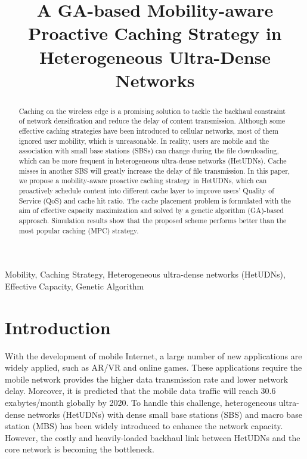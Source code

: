 \documentclass[conference]{IEEEtran}
\begin{document}
\title{A GA-based Mobility-aware Proactive Caching Strategy in Heterogeneous Ultra-Dense Networks}

\author{


}

\maketitle

\begin{abstract}
Caching on the wireless edge is a promising solution to tackle the backhaul constraint of network densification and reduce the delay of content transmission. Although some effective caching strategies have been introduced to cellular networks, most of them ignored user mobility, which is unreasonable. In reality, users are mobile and the association with small base stations (SBSs) can change during the file downloading, which can be more frequent in heterogeneous ultra-dense networks (HetUDNs). Cache misses in another SBS will greatly increase the delay of file transmission. In this paper, we propose a mobility-aware proactive caching strategy in HetUDNs, which can proactively schedule content into different cache layer to improve users’ Quality of Service (QoS) and cache hit ratio. The cache placement problem is formulated with the aim of effective capacity maximization and solved by a genetic algorithm (GA)-based approach. Simulation results show that the proposed scheme performs better than the most popular caching (MPC) strategy.
\end{abstract}

\begin{IEEEkeywords}
 Mobility, Caching Strategy, Heterogeneous ultra-dense networks (HetUDNs), Effective Capacity, Genetic Algorithm
\end{IEEEkeywords}

\section{Introduction}
With the development of mobile Internet, a large number of new applications are widely applied, such as AR/VR and online games. These applications require the mobile network provides the higher data transmission rate and lower network delay. Moreover, it is predicted that the mobile data traffic will reach 30.6 exabytes/month globally by 2020\cite{cisco}. To handle this challenge, heterogeneous ultra-dense networks (HetUDNs) with dense small base stations (SBS) and macro base station (MBS) has been widely introduced to enhance the network capacity. However, the costly and heavily-loaded backhaul link between HetUDNs and the core network is becoming the bottleneck\cite{6963798}.
\end{document}
